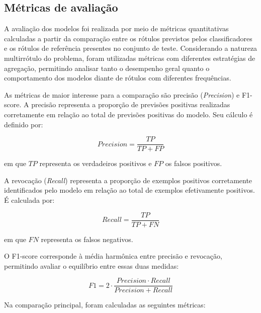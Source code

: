 \subsection{Métricas de avaliação}
\label{subsec:metricas}

A avaliação dos modelos foi realizada por meio de métricas quantitativas calculadas a partir da comparação entre os rótulos previstos pelos classificadores e os rótulos de referência presentes no conjunto de teste. Considerando a natureza multirrótulo do problema, foram utilizadas métricas com diferentes estratégias de agregação, permitindo analisar tanto o desempenho geral quanto o comportamento dos modelos diante de rótulos com diferentes frequências.

As métricas de maior interesse para a comparação são precisão (\textit{Precision}) e F1-score. A precisão representa a proporção de previsões positivas realizadas corretamente em relação ao total de previsões positivas do modelo. Seu cálculo é definido por:

\begin{equation}
Precision = \frac{TP}{TP + FP}
\end{equation}

em que $TP$ representa os verdadeiros positivos e $FP$ os falsos positivos.

A revocação (\textit{Recall}) representa a proporção de exemplos positivos corretamente identificados pelo modelo em relação ao total de exemplos efetivamente positivos. É calculada por:

\begin{equation}
Recall = \frac{TP}{TP + FN}
\end{equation}

em que $FN$ representa os falsos negativos.

O F1-score corresponde à média harmônica entre precisão e revocação, permitindo avaliar o equilíbrio entre essas duas medidas:

\begin{equation}
F1 = 2 \cdot \frac{Precision \cdot Recall}{Precision + Recall}
\end{equation}

Na comparação principal, foram calculadas as seguintes métricas:

